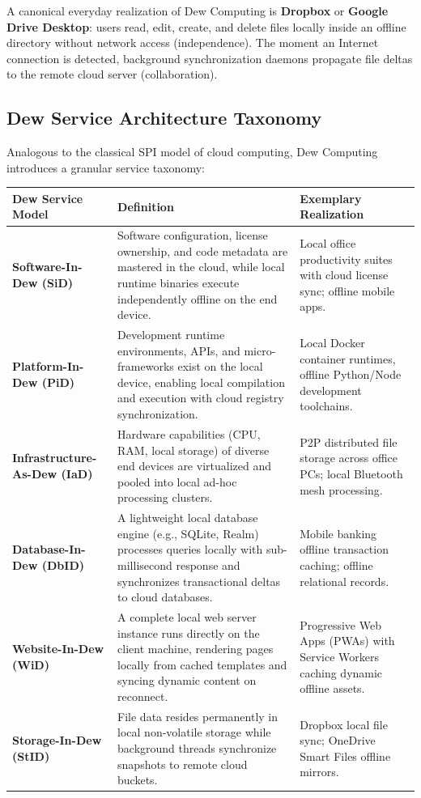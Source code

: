 A canonical everyday realization of Dew Computing is \textbf{Dropbox} or \textbf{Google Drive Desktop}: users read, edit, create, and delete files locally inside an offline directory without network access (independence). The moment an Internet connection is detected, background synchronization daemons propagate file deltas to the remote cloud server (collaboration).

\subsection{Dew Service Architecture Taxonomy}
Analogous to the classical SPI model of cloud computing, Dew Computing introduces a granular service taxonomy:
\begin{center}
\begin{tabularx}{\textwidth}{>{\bfseries}l X X}
\toprule
Dew Service Model & Definition & Exemplary Realization\\
\midrule
Software-In-Dew (SiD) & Software configuration, license ownership, and code metadata are mastered in the cloud, while local runtime binaries execute independently offline on the end device. & Local office productivity suites with cloud license sync; offline mobile apps.\\
\addlinespace
Platform-In-Dew (PiD) & Development runtime environments, APIs, and micro-frameworks exist on the local device, enabling local compilation and execution with cloud registry synchronization. & Local Docker container runtimes, offline Python/Node development toolchains.\\
\addlinespace
Infrastructure-As-Dew (IaD) & Hardware capabilities (CPU, RAM, local storage) of diverse end devices are virtualized and pooled into local ad-hoc processing clusters. & P2P distributed file storage across office PCs; local Bluetooth mesh processing.\\
\addlinespace
Database-In-Dew (DbID) & A lightweight local database engine (e.g., SQLite, Realm) processes queries locally with sub-millisecond response and synchronizes transactional deltas to cloud databases. & Mobile banking offline transaction caching; offline relational records.\\
\addlinespace
Website-In-Dew (WiD) & A complete local web server instance runs directly on the client machine, rendering pages locally from cached templates and syncing dynamic content on reconnect. & Progressive Web Apps (PWAs) with Service Workers caching dynamic offline assets.\\
\addlinespace
Storage-In-Dew (StID) & File data resides permanently in local non-volatile storage while background threads synchronize snapshots to remote cloud buckets. & Dropbox local file sync; OneDrive Smart Files offline mirrors.\\
\bottomrule
\end{tabularx}
\end{center}

